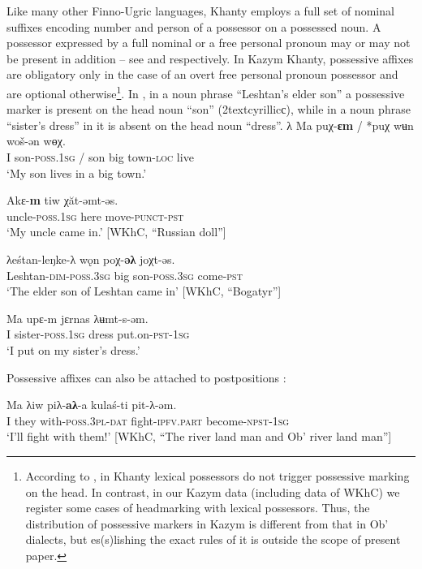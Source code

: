 \documentclass[output=paper]{langscibook}
\begin{document}
Like many other Finno-Ugric languages, Khanty employs a full set of nominal suffixes encoding number and person of a possessor on a possessed noun. A possessor expressed by a full nominal or a free personal pronoun may or may not be present in addition – see  and  respectively. In Kazym Khanty, possessive affixes are obligatory only in the case of an %
overt free personal pronoun possessor  and are optional otherwise\footnote{According to \citep[52]{Nikolaeva1999Ostyak}, in Khanty lexical possessors do not trigger possessive marking on the head. In contrast, in our Kazym data (including data of WKhC) we register some cases of headmarking with lexical possessors. Thus, the distribution of possessive markers in Kazym is different from that in Ob’ dialects, but es(s)lishing the exact rules of it is outside the scope of present paper.}. In , in a noun phrase “Leshtan’s elder son” a possessive marker is present on the head noun “son” (2textcyrillic{с), while in a noun phrase “sister’s dress” in  it is absent on the head noun “dress”. λ}
\ea 
\label{ex:Volkova:2}
	\ea 
	\label{ex:Volkova:2a}
  	 \gll Ma puχ-\textbf{ɛm} / *puχ wʉn woš-ən wɵχ.\\
  	 I son-\textsc{poss.1sg} / son big town\textsc{{}-loc} live \\
  	 \glt ‘My son lives in a big town.’

	\ex
	\label{ex:Volkova:2b}
  	 \gll Akɛ-\textbf{m} tiw χăt-əmt-əs.\\
  	 uncle\textsc{{}-poss.1sg} here move\textsc{{}-punct-pst}\\
  	 \glt ‘My uncle came in.’ [WKhC, “Russian doll”]
	
	\ex
	\label{ex:Volkova:2c}
  	 \gll λeśtan-leŋke-λ wǫn poχ-\textbf{əλ} joχt-əs.\\
  	 Leshtan\textsc{{}-dim-poss.3sg} big son\MakeUppercase{{}-}\textsc{poss.3sg} come\textsc{{}-pst}\\
  	 \glt ‘The elder son of Leshtan came in’ [WKhC, “Bogatyr”]
  	 
  	 \ex
	\label{ex:Volkova:2d}
  	 \gll Ma upɛ-m jɛrnas λʉmt-s-əm.\\
  	 I sister\textsc{{}-poss.1sg} dress put.on\textsc{{}-pst-1sg}\\
  	 \glt ‘‎I put on my sister’s dress.’
	\z
\z


Possessive affixes can also be attached to postpositions :


\ea 
\label{ex:Volkova:3}
 \gll Ma λiw piλ{}-\textbf{aλ}{}-a kulaś-ti pit{}-λ{}-əm.\\
 I they with\textsc{{}-poss.3pl-dat} fight\textsc{{}-ipfv.part} become\textsc{{}-npst-1sg}\\
 \glt ‘I’ll fight with them!’ [WKhC, “The river land man and Ob’ river land man”]
\z
\end{document}
